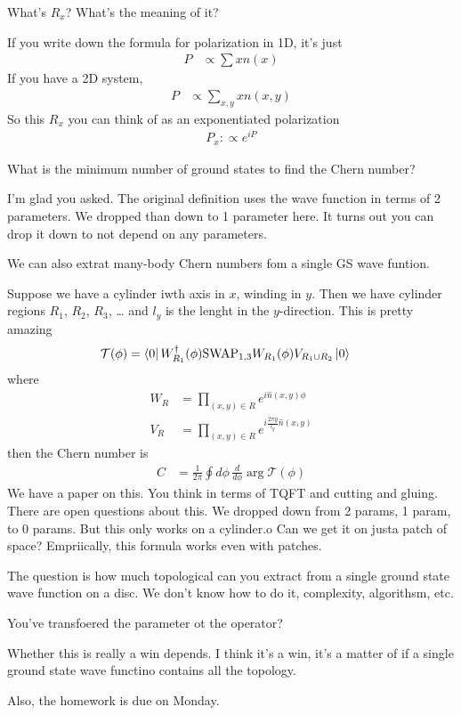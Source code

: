 \begin{question}
    What's $R_x$?
    What's the meaning of it?
\end{question}
If you write down the formula for polarization in 1D,
it's just
\begin{align}
    P &\propto \sum x n(x)
\end{align}
If you have a 2D system,
\begin{align}
    P &\propto  \sum_{x, y} x n(x, y)
\end{align}
So this $R_x$ you can think of as an exponentiated polarization
\begin{align}
    P_x :\propto e^{i P}
\end{align}

\begin{question}
    What is the minimum number of ground states to find the Chern number?
\end{question}
I'm glad you asked.
The original definition uses the wave function in terms of 2 parameters.
We dropped than down to 1 parameter here.
It turns out you can drop it down to not depend on any parameters.

We can also extrat many-body Chern numbers fom a single GS wave funtion.

Suppose we have a cylinder iwth axis in $x$,
winding in $y$.
Then we have cylinder regions $R_1$, $R_2$, $R_3$, \ldots
and $l_y$ is the lenght in the $y$-direction.
This is pretty amazing
\begin{align}
    \mathcal{T}(\phi) &=
    \bra{0}
    W_{R_1}^\dagger(\phi) 
    \mathrm{SWAP}_{1, 3}
    W_{R_1}(\phi)
    V_{R_1 \cup R_2}
    \ket{0}
\end{align}
where
\begin{align}
    W_R &= \prod_{(x, y)\in R} e^{i\hat{n} (x, y) \phi}\\
    V_R &=
    \prod_{(x, y)\in R} e^{i \frac{2\pi y}{l_y} \hat{n}(x, y)}
\end{align}
then the Chern number is
\begin{align}
    C &= \frac{1}{2\pi} \oint d\phi\,
    \frac{d}{d\phi} \arg\mathcal{T}(\phi)
\end{align}
We have a paper on this.
You think in terms of TQFT and cutting and gluing.
There are open questions about this.
We dropped down from 2 params, 1 param, to 0 params.
But this only works on a cylinder.o
Can we get it on justa patch of space?
Empriically,
this formula works even with patches.

The question is how much topological can you extract from a single ground state
wave function on a disc.
We don't know how to do it,
complexity,
algorithsm,
etc.

\begin{question}
    You've transfoered the parameter ot the operator?
\end{question}
Whether this is really a win depends.
I think it's a win,
it's a matter of if a single ground state wave functino contains all the
topology.

Also,
the homework is due on Monday.

